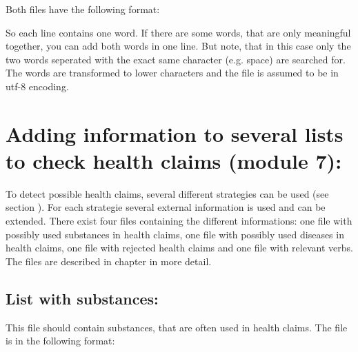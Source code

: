 \documentclass[letterpaper,10pt,english]{sphinxmanual}
\begin{document}
Both files have the following format:

%
\begin{sphinxVerbatim}[commandchars=\\\{\}]
\end{sphinxVerbatim}

So each line contains one word. If there are some words, that are only
meaningful together, you can add both words in one line. But note,
that in this case only the two words seperated with the exact same
character (e.g. space) are searched for. The words are transformed to
lower characters and the file is assumed to be in utf-8 encoding.


\section{Adding information to several lists to check health claims (module 7):}
\label{\detokenize{online_learning:adding-information-to-several-lists-to-check-health-claims-module-7}}
To detect possible health claims, several different strategies can be
used (see section {\hyperref[\detokenize{modules:module-hc}]{}}). For each strategie several
external information is used and can be extended. There exist four
files containing the different informations: one file with possibly
used substances in health claims, one file with possibly used diseases
in health claims, one file with rejected health claims and one file
with relevant verbs. The files are described in chapter
{\hyperref[\detokenize{external_data:external-data}]{}} in more detail.


\subsection{List with substances:}
\label{\detokenize{online_learning:list-with-substances}}\label{\detokenize{online_learning:substances-online}}
This file should contain substances, that are often used in health
claims. The file is in the following format:

%
\begin{sphinxVerbatim}[commandchars=\\\{\}]
 
\end{sphinxVerbatim}
\end{document}
